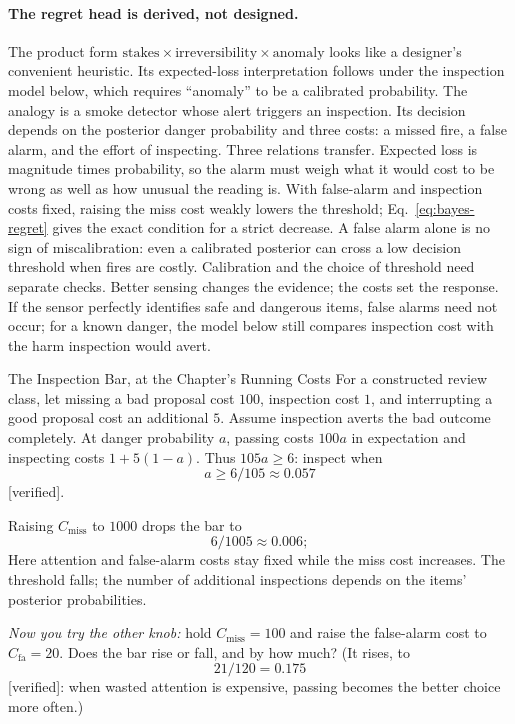 \documentclass[11pt,a4paper]{article}
\theoremstyle{definition}
\theoremstyle{plain}
\begin{document}
\paragraph{The regret head is derived, not designed.} The product form
$\mathrm{stakes}\times\mathrm{irreversibility}\times\mathrm{anomaly}$ looks like a
designer's convenient heuristic. Its expected-loss interpretation follows under the inspection model below,
which requires ``anomaly'' to be a calibrated probability. The analogy
is a smoke detector whose alert triggers an inspection. Its decision depends
on the posterior danger probability and three costs: a missed fire, a false
alarm, and the effort of inspecting. Three relations transfer. Expected loss
is magnitude times probability, so the alarm must weigh what it would cost to
be wrong as well as how unusual the reading is. With false-alarm and
inspection costs fixed, raising the miss cost weakly lowers the threshold;
Eq.~\ref{eq:bayes-regret} gives the exact condition for a strict decrease. A false alarm alone is no sign of miscalibration: even a calibrated
posterior can cross a low decision threshold when fires are costly. Calibration
and the choice of threshold need separate checks. Better sensing changes the evidence; the costs set the response. If the
sensor perfectly identifies safe and dangerous items, false alarms need not
occur; for a known danger, the model below still compares inspection cost
with the harm inspection would avert.

\begin{pdexample}{The Inspection Bar, at the Chapter's Running Costs}
\setlength{\parskip}{4pt plus 1pt}
\label{ex:inspection-bar}
For a constructed review class, let missing a bad proposal cost $100$,
inspection cost $1$, and interrupting a good proposal cost an additional $5$.
Assume inspection averts the bad outcome completely. At danger probability $a$,
passing costs $100a$ in expectation and inspecting costs $1+5(1-a)$.
Thus $105a\ge6$: inspect when
\[
a\ge 6/105\approx 0.057
\]
[verified].

Raising $C_{\mathrm{miss}}$ to $1000$ drops the
bar to
\[
6/1005\approx 0.006;
\]
Here attention and false-alarm costs stay fixed while the miss cost increases.
The threshold falls; the number of additional inspections depends on the
items' posterior probabilities.

\emph{Now you
try the other knob:} hold $C_{\mathrm{miss}}{=}100$ and raise the false-alarm cost
to $C_{\mathrm{fa}}{=}20$. Does the bar rise or fall, and by how much? (It rises,
to
\[
21/120=0.175
\]
[verified]: when wasted attention is expensive, passing becomes the better
choice more often.)
\end{pdexample}
\end{document}
